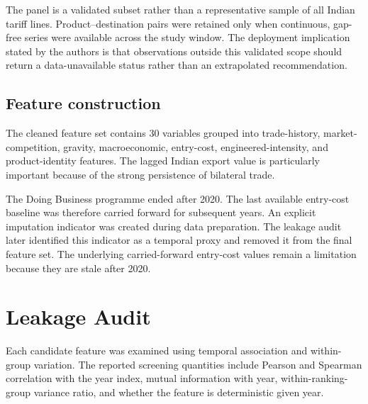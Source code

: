 \documentclass[conference]{IEEEtran}
\begin{document}
The panel is a validated subset rather than a representative sample of all Indian tariff lines. Product--destination pairs were retained only when continuous, gap-free series were available across the study window. The deployment implication stated by the authors is that observations outside this validated scope should return a data-unavailable status rather than an extrapolated recommendation.

\subsection{Feature construction}

The cleaned feature set contains 30 variables grouped into trade-history, market-competition, gravity, macroeconomic, entry-cost, engineered-intensity, and product-identity features. The lagged Indian export value is particularly important because of the strong persistence of bilateral trade.

The Doing Business programme ended after 2020. The last available entry-cost baseline was therefore carried forward for subsequent years. An explicit imputation indicator was created during data preparation. The leakage audit later identified this indicator as a temporal proxy and removed it from the final feature set. The underlying carried-forward entry-cost values remain a limitation because they are stale after 2020.

\section{Leakage Audit}

Each candidate feature was examined using temporal association and within-group variation. The reported screening quantities include Pearson and Spearman correlation with the year index, mutual information with year, within-ranking-group variance ratio, and whether the feature is deterministic given year.
\end{document}
